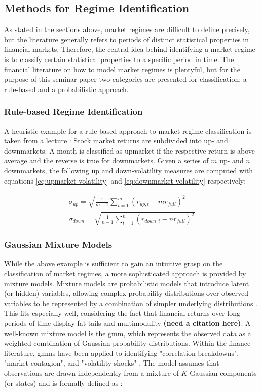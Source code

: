 \subsection{Methods for Regime Identification}
As stated in the sections above, market regimes are difficult to define precisely, but the literature generally refers to periods of distinct statistical properties in financial markets. Therefore, the central idea behind identifying a market regime is to classify certain statistical properties to a specific period in time.
The financial literature on how to model market regimes is plentyful, but for the purpose of this seminar paper two categories are presented for classification: a rule-based and a probabilistic approach.

\subsubsection{Rule-based Regime Identification}
A heuristic example for a rule-based approach to market regime classification is taken from a lecture \citep{oertmann2026}: Stock market returns are subdivided into up- and downmarkets. A month is classified as upmarket if the respective return is above average and the reverse is true for downmarkets.
Given a series of $m$ up- and $n$ downmarkets, the following up and down-volatility measures are computed with equations \eqref{eq:upmarket-volatility} and \eqref{eq:downmarket-volatility} respectively: 

\begin{align}
\sigma_{up}=\sqrt{\frac{1}{m-1}\sum_{t=1}^{m}(r_{up,t}-mr_{full})^2}
\label{eq:upmarket-volatility}
\\
\sigma_{down}=\sqrt{\frac{1}{n-1}\sum_{t=1}^{n}(r_{down,t}-nr_{full})^2}
\label{eq:downmarket-volatility}
\end{align}

\subsubsection{Gaussian Mixture Models}
While the above example is sufficient to gain an intuitive grasp on the classification of market regimes, a more sophisticated approach is provided by mixture models.
Mixture models are probabilistic models that introduce latent (or hidden) variables, allowing complex probability distributions over observed variables to be represented by a combination of simpler underlying distributions \citep{bishop_chapter9}.
This fits especially well, considering the fact that financial returns over long periods of time display fat tails and multimodality \textbf{(need a citation here)}.
A well-known mixture model is the \gls{gmm}, which represents the observed data as a weighted combination of Gaussian probability distributions.
Within the finance literature, \gls{gmm}s have been applied to identifying "correlation breakdowns", "market contagion", and "volatility shocks" \citep{machinelearning2020_chapter2}.
The model assumes that observations are drawn independently from a mixture of $K$ Gaussian components (or states) and is formally defined as \citep{bishop_gmm}: 

